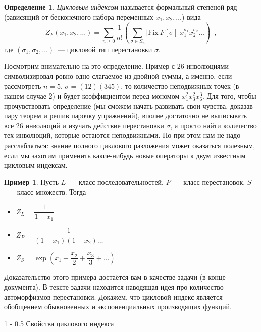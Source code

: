 \documentclass{article}
\makeatletter
\theoremstyle{definition}
\newtheorem{example}{Пример}
\newtheorem*{definition}{Определение}
\renewcommand{\subsection}{\@startsection
{subsection}%
{1}%
{\z@}%
{-\baselineskip}%
{0.5\baselineskip}%
{\centering\large\scshape}} %
\makeatother
\begin{document}
\begin{definition}
	\textit{Цикловым индексом} называется формальный степеной ряд (зависящий от 
	бесконечного набора переменных \( x_1, x_2, \ldots \)) вида
	\[
		Z_F(x_1, x_2, \ldots) = \sum_{n \geq 0} \dfrac{1}{n!} \left(
			\sum_{\sigma \in S_n} |\mathrm{Fix}\ F[\sigma]|x_1^{\sigma_1} 
			x_2^{\sigma_2} \ldots
		\right) \enspace ,
	\]
	где \( (\sigma_1, \sigma_2, \ldots) \)~--- цикловой тип перестановки \( 
	\sigma \).
\end{definition}

Посмотрим внимательно на это определение. Пример с 26 инволюциями символизировал
ровно одно слагаемое из двойной суммы, а именно, если рассмотреть \( n = 5 \),
\( \sigma = (12)(345) \), то количество неподвижных точек (в нашем случае 2) и
будет коэффициентом перед мономом \( x_1^2 x_3^2 x_6^3 \). Для того, чтобы
прочувствовать определение (мы сможем начать развивать свои чувства, доказав
пару теорем и решив парочку упражнений), вполне достаточно не выписывать все 26
инволюций и изучать действие перестановки \( \sigma \),  а просто найти
количество тех инволюций, которые остаются неподвижными. Но при этом нам не надо
расслабляться: знание полного циклового разложения может оказаться полезным,
если мы захотим применить какие-нибудь новые операторы к двум известным цикловым
индексам.

\begin{example}
	Пусть \( L \)~--- класс последовательностей, \( P \)~--- класс 
	перестановок, \( S \)~--- класс множеств. Тогда
	\begin{itemize}
		\item	\( Z_L = \dfrac{1}{1 - x_1} \)
		\item 	\( Z_P = \dfrac{1}{(1-x_1)(1-x_2)\ldots} \)
		\item   \( Z_S = \exp \left(
			x_1 + \dfrac{x_2}{2} + \dfrac{x_3}{3} + \ldots
		\right) \)
	\end{itemize}
\end{example}

Доказательство этого примера достаётся вам в качестве задачи (в конце
документа). В тексте задачи
находится наводящая идея про количество автоморфизмов перестановки.
Докажем, что цикловой индекс является обобщением обыкновенных и 
экспоненциальных производящих функций.

\subsection{Свойства циклового индекса}
\end{document}
